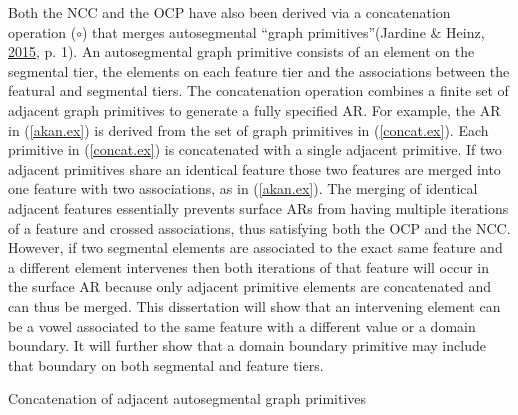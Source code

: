 \documentclass[,doc,floatsintext]{apa6}
\theoremstyle{definition}
\theoremstyle{definition}
\theoremstyle{definition}
\theoremstyle{remark}
\begin{document}
Both the NCC and the OCP have also been derived via a concatenation
operation (\(\circ\)) that merges autosegmental \enquote{graph
primitives}(Jardine \& Heinz,
\protect\hyperlink{ref-jardineheinz2015}{2015}, p. 1). An autosegmental
graph primitive consists of an element on the segmental tier, the
elements on each feature tier and the associations between the featural
and segmental tiers. The concatenation operation combines a finite set
of adjacent graph primitives to generate a fully specified AR. For
example, the AR in (\ref{akan.ex}) is derived from the set of graph
primitives in (\ref{concat.ex}). Each primitive in (\ref{concat.ex}) is
concatenated with a single adjacent primitive. If two adjacent
primitives share an identical feature those two features are merged into
one feature with two associations, as in (\ref{akan.ex}). The merging of
identical adjacent features essentially prevents surface ARs from having
multiple iterations of a feature and crossed associations, thus
satisfying both the OCP and the NCC. However, if two segmental elements
are associated to the exact same feature and a different element
intervenes then both iterations of that feature will occur in the
surface AR because only adjacent primitive elements are concatenated and
can thus be merged. This dissertation will show that an intervening
element can be a vowel associated to the same feature with a different
value or a domain boundary. It will further show that a domain boundary
primitive may include that boundary on both segmental and feature tiers.

\begin{exe}
\ex \label{concat.ex} Concatenation of adjacent autosegmental graph primitives \\
\end{exe}
\end{document}
